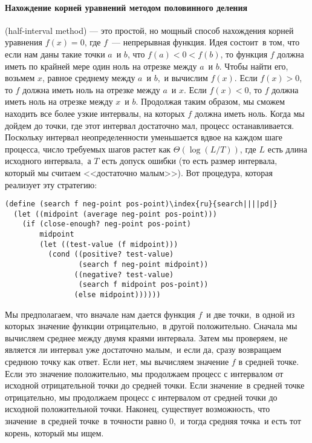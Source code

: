 \paragraph{Нахождение корней уравнений методом половинного
деления}


 (half-interval method) --- это простой, но мощный способ
нахождения корней уравнения $f(x) = 0$, где
$f$~--- непрерывная функция.  Идея состоит~в том, что если
нам даны такие
точки $a$~и $b$, что $f(a) < 0 <
f(b)$, то функция $f$ должна иметь по крайней мере
один ноль на отрезке между $a$~и $b$.  Чтобы
найти его, возьмем $x$, равное среднему между
$a$~и $b$,~и вычислим $f(x)$. Если
$f(x) > 0$, то $f$ должна иметь ноль на
отрезке между $a$~и $x$. Если $f(x) <
0$, то $f$ должна иметь ноль на отрезке между
$x$~и $b$.  Продолжая таким образом, мы сможем
находить все более узкие интервалы, на которых $f$ должна
иметь ноль.  Когда мы дойдем до точки, где этот интервал достаточно
мал, процесс останавливается.  Поскольку интервал неопределенности
уменьшается вдвое на каждом шаге процесса, число требуемых шагов
растет как $\Theta (\log (L / T))$, где $L$
есть длина исходного интервала,~а $T$ есть допуск 
ошибки (то есть размер интервала, который мы считаем <<достаточно
малым>>).  Вот процедура, которая реализует эту стратегию:

\begin{Verbatim}[fontsize=\small]
(define (search f neg-point pos-point)\index{ru}{search||||pd|}
  (let ((midpoint (average neg-point pos-point)))
    (if (close-enough? neg-point pos-point)
        midpoint
        (let ((test-value (f midpoint)))
          (cond ((positive? test-value)
                 (search f neg-point midpoint))
                ((negative? test-value)
                 (search f midpoint pos-point))
                (else midpoint))))))
\end{Verbatim}

Мы предполагаем, что вначале нам дается функция
$f$~и две точки,~в одной из которых значение функции
отрицательно,~в другой положительно.  Сначала мы вычисляем среднее
между двумя краями интервала.  Затем мы проверяем, не является ли
интервал уже достаточно малым,~и если да, сразу возвращаем среднюю
точку как ответ.  Если нет, мы вычисляем значение $f$ в
средней точке. Если это значение положительно, мы продолжаем процесс
с интервалом от исходной отрицательной точки до средней точки.  Если
значение~в средней точке отрицательно, мы продолжаем процесс с
интервалом от средней точки до исходной положительной точки.  Наконец, 
существует возможность, что значение~в средней точке~в точности равно
0,~и тогда средняя точка~и есть тот корень, который мы ищем.

